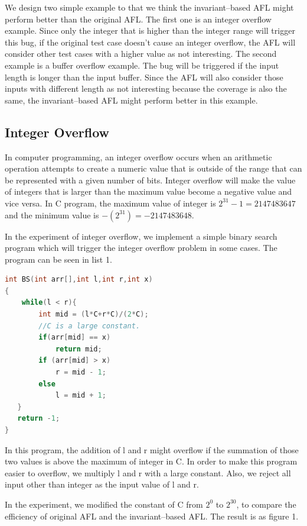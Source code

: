 \documentclass[sigplan,10pt,review = false]{acmart}\settopmatter{printfolios=true,printccs=false,printacmref=false}
\begin{document}
We design two simple example to that we think the invariant--based AFL might perform better than the original AFL. The first one is an integer overflow example. Since only the integer that is higher than the integer range will trigger this bug, if the original test case doesn't cause an integer overflow, the AFL will consider other test cases with a higher value as not interesting. The second example is a buffer overflow example. The bug will be triggered if the input length is longer than the input buffer. Since the AFL will also consider those inputs with different length as not interesting because the coverage is also the same, the invariant--based AFL might perform better in this example.

\subsection{Integer Overflow}

In computer programming, an integer overflow occurs when an arithmetic operation attempts to create a numeric value that is outside of the range that can be represented with a given number of bits. Integer overflow will make the value of integers that is larger than the maximum value become a negative value and vice versa. In C program, the maximum value of integer is $2^{31}-1 = 2147483647$ and the minimum value is $-(2^{31}) = -2147483648$.

In the experiment of integer overflow, we implement a simple binary search program which will trigger the integer overflow problem in some cases. The program can be seen in list 1.

\begin{lstlisting}[language=C, caption=Binary Search example]
int BS(int arr[],int l,int r,int x)
{
    while(l < r){
        int mid = (l*C+r*C)/(2*C);
        //C is a large constant.
        if(arr[mid] == x)
            return mid;
        if (arr[mid] > x) 
            r = mid - 1;
        else
            l = mid + 1;
   }
   return -1;
}
\end{lstlisting}

In this program, the addition of l and r might overflow if the summation of those two values is above the maximum of integer in C. In order to make this program easier to overflow, we multiply l and r with a large constant. Also, we reject all input other than integer as the input value of l and r.

In the experiment, we modified the constant of C from $2^{0}$ to $2^{30}$, to compare the efficiency of original AFL and the invariant--based AFL. The result is as figure 1. 
\end{document}
